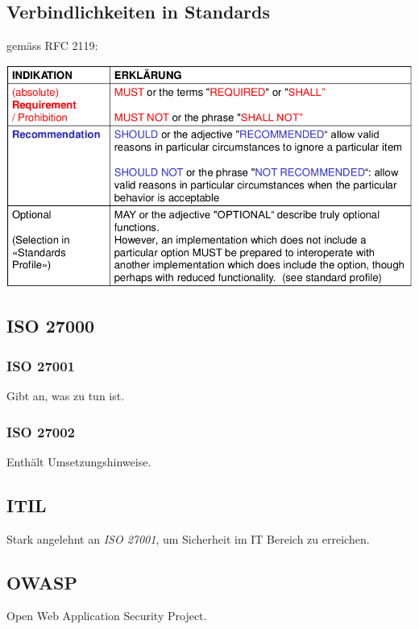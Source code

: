 \subsection{Verbindlichkeiten in Standards}
gemäss RFC 2119:

\includegraphics[scale=0.5]{img/rfc2119.png}
	
\subsection{ISO 27000}

\subsubsection{ISO 27001}
	Gibt an, was zu tun ist.
\subsubsection{ISO 27002}
	Enthält Umsetzungshinweise.

\subsection{ITIL}
	Stark angelehnt an \emph{ISO 27001}, um Sicherheit im IT Bereich zu erreichen.


\subsection{OWASP}	
	Open Web Application Security Project.

